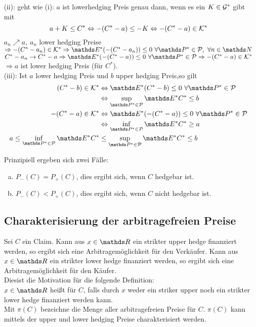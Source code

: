 (ii): geht wie (i): $a$ ist lowerhedging Preis genau dann, wenn es ein $K\in \mathcal{G}^*$ gibt mit
\[
a+K\le C^* \Leftrightarrow -(C^*-a)\le-K \Leftrightarrow -(C^*-a)\in \mathcal{K}^*
\]
$a_n \nearrow a,~a_n$ lower hedging Preise $\Rightarrow -(C^*-a_n)\in\mc{K}^*\Rightarrow\E^*(-(C^*-a_n))\le 0~\forall\Pw^*\in\mc{P},~\forall n\in\N$\\
$C^*-a_n\to C^*-a\Rightarrow\E^*(-(C^*-a))\le0~\forall \Pw^*\in\mc{P}\Rightarrow-(C^*-a)\in\mc{K}^*$\\
$\Rightarrow a$ ist lower hedging Preis (für $C^*$).\\

(iii): Ist $a$ lower hedging Preis und $b$ upper hedging Preis,so gilt
\begin{equation*}
\begin{aligned}
	(C^*-b)\in \mc{K}^* &\Leftrightarrow \E^*(C^*-b)\le 0 ~\forall \Pw^*\in\mc{P}\\
	&\Leftrightarrow \sup\limits_{\Pw^*\in\mc{P}} \E^*C^*\le b\\
	-(C^*-a)\in\mc{K}^* &\Leftrightarrow \E^*(-(C^*-a))\le 0~\forall\Pw^*\in\mc{P}\\
	&\Leftrightarrow \inf\limits_{\Pw^*\in\mc{P}}\E^*C^*\ge a\\
	a\le \inf\limits_{\Pw^*\in\mc{P}}\E^*C^* &\le \sup\limits_{\Pw^*\in\mc{P}} \E^*C^* \le b
\end{aligned}
\end{equation*}

Prinzipiell ergeben sich zwei Fälle:
\begin{enumerate}[(a)]
	\item $P_-(C)=P_+(C)$, dies ergibt sich, wenn $C$ hedgebar ist.
	\item $P_-(C)<P_+(C)$, dies ergibt sich, wenn $C$ nicht hedgebar ist.
\end{enumerate}


\subsection{Charakterisierung der arbitragefreien Preise}
\label{sub:arbitragefreier_preis}
Sei $C$ ein Claim.
Kann aus $x\in \R$ ein strikter upper hedge finanziert werden, so ergibt sich eine Arbitragemöglichkeit für den Verkäufer.
Kann aus $x\in\R$ ein strikter lower hedge finanziert werden, so ergibt sich eine Arbitragemöglichkeit für den Käufer.\\
Diesist die Motivation für die folgende Definition:\\
$x\in \R$ heißt  für $C$, falls durch $x$ weder ein striker upper noch ein strikter lower hedge finanziert werden kann.\\
Mit $\pi(C)$ bezeichne die Menge aller arbitragefreien Preise für $C$.
$\pi(C)$ kann mittels der upper und lower hedging Preise charakterisiert werden.

